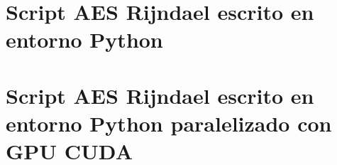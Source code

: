\documentclass[../main/main.tex]{subfiles}
\begin{document}
\espacio

\tocless\section{Script AES Rijndael escrito en entorno Python}\label{anexo:script_aes_original}\hfill


\clearpage

\tocless\section{Script AES Rijndael escrito en entorno Python paralelizado con GPU CUDA}\label{anexo:script_aes_modificado}\hfill

\end{document}
